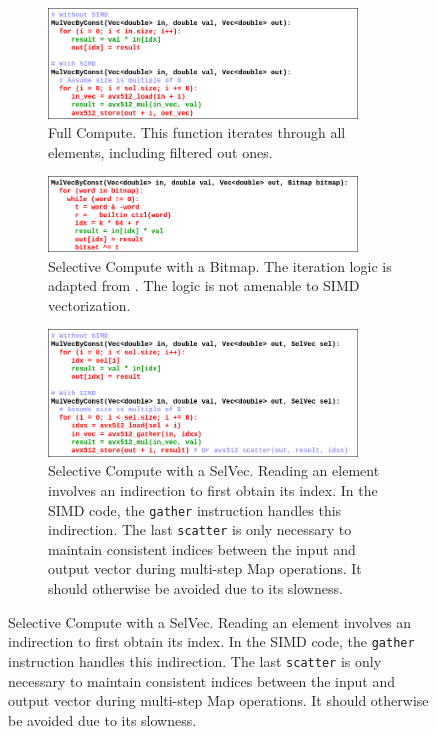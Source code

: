 \documentclass[12pt]{cmuthesis}
\begin{document}
\begin{figure}[t!]
\centering
\hspace*{\fill}%
\begin{subfigure}{.8\textwidth}
 \centering
 \includegraphics[width=0.9\textwidth]{images/RationaleMapFull.png}
 \caption{Full Compute. This function iterates through all elements, including filtered out ones.}
  \label{fig:rationale_full}
\end{subfigure}%
\hspace*{\fill}%
\vspace*{8pt}%

\hspace*{\fill}%
\begin{subfigure}{.8\textwidth}
 \centering
 \includegraphics[width=0.9\textwidth]{images/RationaleMapBitmap.png}
 \caption{Selective Compute with a Bitmap. The iteration logic is adapted from \cite{bitmap_iteration}. The logic is not amenable to SIMD vectorization.}
  \label{fig:rationale_bitmap}
\end{subfigure}%
\hspace*{\fill}%
\vspace*{8pt}%

\hspace*{\fill}%
\begin{subfigure}{.8\textwidth}
 \centering
 \includegraphics[width=0.9\textwidth]{images/RationaleMapSelVec.png}
 \caption{Selective Compute with a SelVec. Reading an element involves an indirection to first obtain its index. In the SIMD code, the \texttt{gather} instruction handles this indirection. The last \texttt{scatter} is only necessary to maintain consistent indices between the input and output vector during multi-step Map operations. It should otherwise be avoided due to its slowness.}
  \label{fig:rationale_selvec}
\end{subfigure}
\hspace*{\fill}%
\vspace*{8pt}%


\end{figure}
\end{document}
